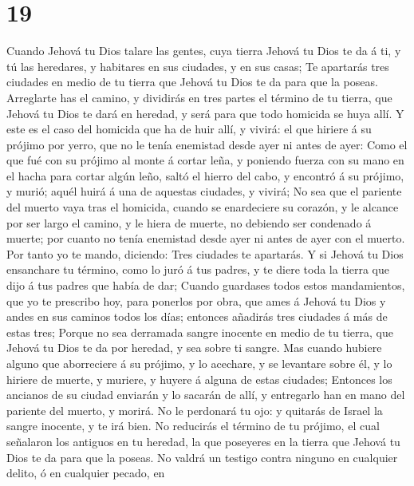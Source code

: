 \hypertarget{section-18}{%
\section{19}\label{section-18}}

 Cuando Jehová tu Dios talare las gentes, cuya tierra Jehová
tu Dios te da á ti, y tú las heredares, y habitares en sus ciudades, y
en sus casas;  Te apartarás tres ciudades en medio de tu
tierra que Jehová tu Dios te da para que la poseas. 
Arreglarte has el camino, y dividirás en tres partes el término de tu
tierra, que Jehová tu Dios te dará en heredad, y será para que todo
homicida se huya allí.  Y este es el caso del homicida que
ha de huir allí, y vivirá: el que hiriere á su prójimo por yerro, que no
le tenía enemistad desde ayer ni antes de ayer:  Como el que
fué con su prójimo al monte á cortar leña, y poniendo fuerza con su mano
en el hacha para cortar algún leño, saltó el hierro del cabo, y encontró
á su prójimo, y murió; aquél huirá á una de aquestas ciudades, y vivirá;
 No sea que el pariente del muerto vaya tras el homicida,
cuando se enardeciere su corazón, y le alcance por ser largo el camino,
y le hiera de muerte, no debiendo ser condenado á muerte; por cuanto no
tenía enemistad desde ayer ni antes de ayer con el muerto. 
Por tanto yo te mando, diciendo: Tres ciudades te apartarás.
 Y si Jehová tu Dios ensanchare tu término, como lo juró á
tus padres, y te diere toda la tierra que dijo á tus padres que había de
dar;  Cuando guardases todos estos mandamientos, que yo te
prescribo hoy, para ponerlos por obra, que ames á Jehová tu Dios y andes
en sus caminos todos los días; entonces añadirás tres ciudades á más de
estas tres;  Porque no sea derramada sangre inocente en
medio de tu tierra, que Jehová tu Dios te da por heredad, y sea sobre ti
sangre.  Mas cuando hubiere alguno que aborreciere á su
prójimo, y lo acechare, y se levantare sobre él, y lo hiriere de muerte,
y muriere, y huyere á alguna de estas ciudades;  Entonces
los ancianos de su ciudad enviarán y lo sacarán de allí, y entregarlo
han en mano del pariente del muerto, y morirá.  No le
perdonará tu ojo: y quitarás de Israel la sangre inocente, y te irá
bien.  No reducirás el término de tu prójimo, el cual
señalaron los antiguos en tu heredad, la que poseyeres en la tierra que
Jehová tu Dios te da para que la poseas.  No valdrá un
testigo contra ninguno en cualquier delito, ó en cualquier pecado, en
